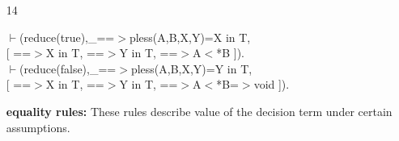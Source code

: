 \documentclass[11pt]{report}
\begin{document}
\begin{enumerate}
 {\bf membership rule:}
 The decision operator yields a value of the type $T$, provided
 both the \emph{then} and the \emph{else} part of the decision
 operator are elements of $T$.
  
 \item[14]
\begin{sf}\begin{tabbing}
$\vdash$(reduce(true),\_\hspace{0.1em}==$>$pless(A,B,X,Y)=X in T, \\[-0.15ex]
\hspace{2em}[ ==$>$X in T, ==$>$Y in T, ==$>$A$<$*B ]).\\[-0.15ex]
$\vdash$(reduce(false),\_\hspace{0.1em}==$>$pless(A,B,X,Y)=Y in T, \\[-0.15ex]
\hspace{2em}[ ==$>$X in T, ==$>$Y in T, ==$>$A$<$*B=$>$void ]).
\end{tabbing}\end{sf}

 {\bf equality rules:}      
 These rules describe value of the decision term under certain
 assumptions. 
  
 \end{enumerate}
  
\end{document}
